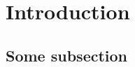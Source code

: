 \graphicspath{ {./content/intro/figures/} }

\section{Introduction}
\label{sec:intro}  %

\lipsum[2]

\subsection{Some subsection}
\label{sec:intro:sub}

\lipsum[3]


